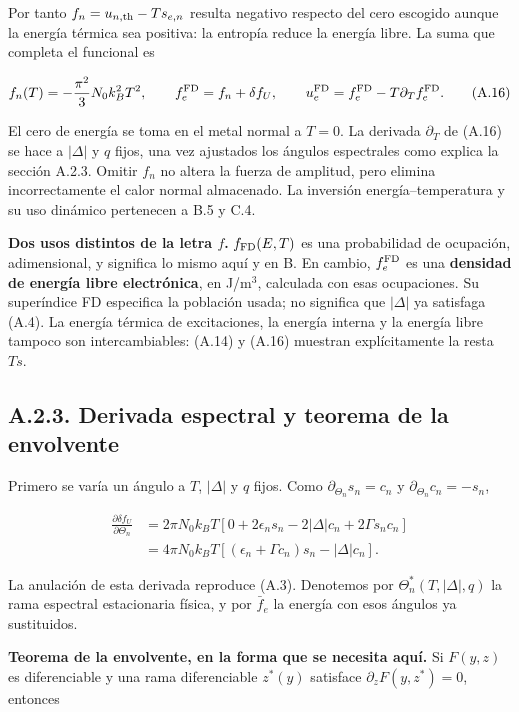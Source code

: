 \documentclass[
  spanish,
  10pt,
  a4paper,
]{article}
\begin{document}
Por tanto \(f_n=u_{n,\rm th}-Ts_{e,n}\) resulta negativo respecto del
cero escogido aunque la energía térmica sea positiva: la entropía reduce
la energía libre. La suma que completa el funcional es

\[
f_n(T)=-\frac{\pi^2}{3}N_0 k_B^2T^2,
\qquad f_e^{\rm FD}=f_n+\delta f_U,
\qquad u_e^{\rm FD}=f_e^{\rm FD}-T\partial_Tf_e^{\rm FD}.
\tag{A.16}
\]

El cero de energía se toma en el metal normal a \(T=0\). La derivada
\(\partial_T\) de (A.16) se hace a \(|\Delta|\) y \(q\) fijos, una vez
ajustados los ángulos espectrales como explica la sección A.2.3. Omitir
\(f_n\) no altera la fuerza de amplitud, pero elimina incorrectamente el
calor normal almacenado. La inversión energía--temperatura y su uso
dinámico pertenecen a B.5 y C.4.

\textbf{Dos usos distintos de la letra \(f\).} \(f_{\rm FD}(E,T)\) es
una probabilidad de ocupación, adimensional, y significa lo mismo aquí y
en B. En cambio, \(f_e^{\rm FD}\) es una \textbf{densidad de energía
libre electrónica}, en J/m\(^3\), calculada con esas ocupaciones. Su
superíndice FD especifica la población usada; no significa que
\(|\Delta|\) ya satisfaga (A.4). La energía térmica de excitaciones, la
energía interna y la energía libre tampoco son intercambiables: (A.14) y
(A.16) muestran explícitamente la resta \(Ts\).

\subsection{A.2.3. Derivada espectral y teorema de la
envolvente}\label{a.2.3.-derivada-espectral-y-teorema-de-la-envolvente}

Primero se varía un ángulo a \(T\), \(|\Delta|\) y \(q\) fijos. Como
\(\partial_{\Theta_n}s_n=c_n\) y \(\partial_{\Theta_n}c_n=-s_n\),

\[
\begin{aligned}
\frac{\partial\delta f_U}{\partial\Theta_n}
&=2\pi N_0k_BT\left[0+2\epsilon_ns_n-2|\Delta|c_n
+2\Gamma s_nc_n\right]\\
&=4\pi N_0k_BT\left[(\epsilon_n+\Gamma c_n)s_n-|\Delta|c_n\right].
\end{aligned}
\tag{A.17}
\]

La anulación de esta derivada reproduce (A.3). Denotemos por
\(\Theta_n^*(T,|\Delta|,q)\) la rama espectral estacionaria física, y
por \(\bar f_e\) la energía con esos ángulos ya sustituidos.

\textbf{Teorema de la envolvente, en la forma que se necesita aquí.} Si
\(F(y,z)\) es diferenciable y una rama diferenciable \(z^*(y)\)
satisface \(\partial_zF(y,z^*)=0\), entonces
\end{document}
